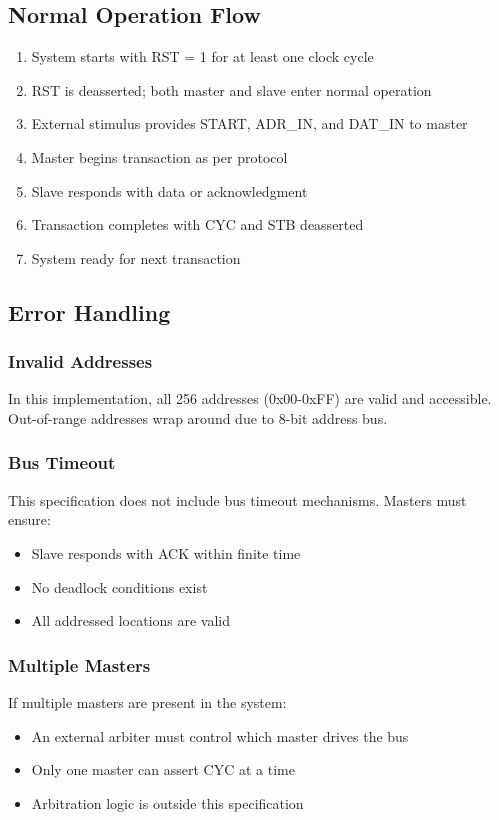 \documentclass[12pt,a4paper]{article}
\begin{document}
\subsection{Normal Operation Flow}

\begin{enumerate}
    \item System starts with RST = 1 for at least one clock cycle
    \item RST is deasserted; both master and slave enter normal operation
    \item External stimulus provides START, ADR\_IN, and DAT\_IN to master
    \item Master begins transaction as per protocol
    \item Slave responds with data or acknowledgment
    \item Transaction completes with CYC and STB deasserted
    \item System ready for next transaction
\end{enumerate}

\subsection{Error Handling}

\subsubsection{Invalid Addresses}
In this implementation, all 256 addresses (0x00-0xFF) are valid and accessible. Out-of-range addresses wrap around due to 8-bit address bus.

\subsubsection{Bus Timeout}
This specification does not include bus timeout mechanisms. Masters must ensure:
\begin{itemize}
    \item Slave responds with ACK within finite time
    \item No deadlock conditions exist
    \item All addressed locations are valid
\end{itemize}

\subsubsection{Multiple Masters}
If multiple masters are present in the system:
\begin{itemize}
    \item An external arbiter must control which master drives the bus
    \item Only one master can assert CYC at a time
    \item Arbitration logic is outside this specification
\end{itemize}
\end{document}
